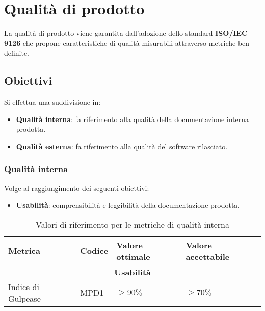 \section{Qualità di prodotto}
La qualità di prodotto viene garantita dall'adozione dello standard \textbf{ISO/IEC 9126} che propone caratteristiche di qualità misurabili attraverso metriche ben definite.

\subsection{Obiettivi}
Si effettua una suddivisione in:
\begin{itemize}
    \item \textbf{Qualità interna}: fa riferimento alla qualità della documentazione interna prodotta.
    \item \textbf{Qualità esterna}: fa riferimento alla qualità del software rilasciato.
\end{itemize}

\subsubsection{Qualità interna}
Volge al raggiungimento dei seguenti obiettivi:
\begin{itemize}
    \item \textbf{Usabilità}: comprensibilità e leggibilità della documentazione prodotta.
\end{itemize}
\begin{table}[H]
    \centering
    \begin{tabularx}{\textwidth}{p{3.5cm}|X|l|l}
        \hline
        \textbf{Metrica} & \textbf{Codice}   & \textbf{Valore ottimale}  & \textbf{Valore accettabile}   \\
        \hline
        \multicolumn{4}{c}{\textbf{Usabilità}} \\
        \hline
        Indice di Gulpease & MPD1 &  $\ge 90\%$ & $\ge 70\%$    \\
        \hline
    \end{tabularx}
    \caption{Valori di riferimento per le metriche di qualità interna}
\end{table}

